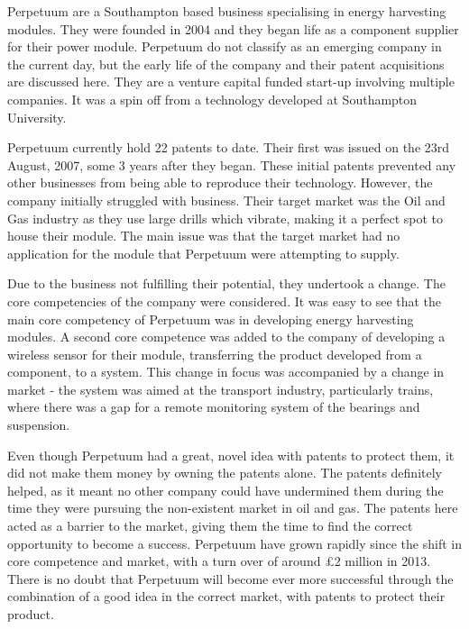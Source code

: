 {}


Perpetuum are a Southampton based business specialising in energy harvesting modules. 
They were founded in 2004 and they began life as a component supplier for their power module.
Perpetuum do not classify as an emerging company in the current day, but the early life of the company and their patent acquisitions are discussed here. 
They are a venture capital funded start-up involving multiple companies.
It was a spin off from a technology developed at Southampton University. 

Perpetuum currently hold 22 patents to date. 
Their first was issued on the 23rd August, 2007, some 3 years after they began.
These initial patents prevented any other businesses from being able to reproduce their technology. 
However, the company initially struggled with business.
Their target market was the Oil and Gas industry as they use large drills which vibrate, making it a perfect spot to house their module.
The main issue was that the target market had no application for the module that Perpetuum were attempting to supply. %

Due to the business not fulfilling their potential, they undertook a change. 
The core competencies of the company were considered.
It was easy to see that the main core competency of Perpetuum was in developing energy harvesting modules. 
A second core competence was added to the company of developing a wireless sensor for their module, transferring the product developed from a component, to a system.
This change in focus was accompanied by a change in market - the system was aimed at the transport industry, particularly trains, where there was a gap for a remote monitoring system of the bearings and suspension. 

Even though Perpetuum had a great, novel idea with patents to protect them, it did not make them money by owning the patents alone.
The patents definitely helped, as it meant no other company could have undermined them during the time they were pursuing the non-existent market in oil and gas.
The patents here acted as a barrier to the market, giving them the time to find the correct opportunity to become a success.
Perpetuum have grown rapidly since the shift in core competence and market, with a turn over of around \pounds 2 million in 2013.
There is no doubt that Perpetuum will become ever more successful through the combination of a good idea in the correct market, with patents to protect their product. 


